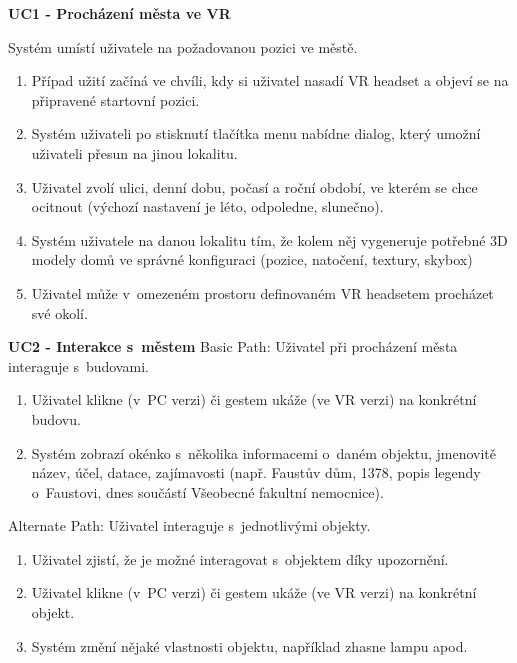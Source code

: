 \documentclass[thesis=B,czech]{FITthesis}[2012/06/26]
\begin{document}
	\begin{description}
	
 		\item \textbf{UC1 - Procházení města ve VR}
 		
 			Systém umístí uživatele na požadovanou pozici ve městě.
 		 	
 		 	\begin{enumerate}
 		 		\item Případ užití začíná ve chvíli, kdy si uživatel nasadí VR headset a objeví se na připravené startovní pozici.
				\item Systém uživateli po stisknutí tlačítka menu nabídne dialog, který umožní uživateli přesun na jinou lokalitu.
				\item Uživatel zvolí ulici, denní dobu, počasí a roční období, ve kterém se chce ocitnout (výchozí nastavení je léto, odpoledne, slunečno).
				\item Systém uživatele  na danou lokalitu tím, že kolem něj vygeneruje potřebné 3D modely domů ve správné konfiguraci (pozice, natočení, textury, skybox)
				\item Uživatel může v~omezeném prostoru definovaném VR headsetem procházet své okolí.
			\end{enumerate} 		 			
 			

 		\item \textbf{UC2 - Interakce s~městem}
		Basic Path: Uživatel při procházení města interaguje s~budovami. 		
 		
 		\begin{enumerate}
				\item Uživatel klikne (v~PC verzi) či gestem ukáže (ve VR verzi) na konkrétní budovu.
				\item Systém zobrazí okénko s~několika informacemi o~daném objektu, jmenovitě název, účel, datace, zajímavosti (např. Faustův dům, 1378, popis legendy o~Faustovi, dnes součástí Všeobecné fakultní nemocnice).
 		\end{enumerate}
 		
 		Alternate Path: Uživatel interaguje s~jednotlivými objekty.
 		\begin{enumerate}
				\item Uživatel zjistí, že je možné interagovat s~objektem díky upozornění.
				\item Uživatel klikne (v~PC verzi) či gestem ukáže (ve VR verzi) na konkrétní objekt.
				\item Systém změní nějaké vlastnosti objektu, například zhasne lampu apod.
 		\end{enumerate}
 		

\end{description}
\end{document}
